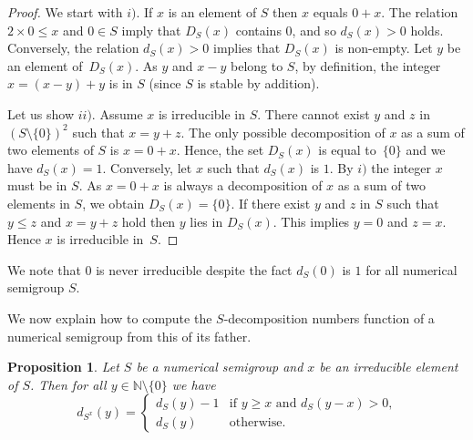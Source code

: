 \documentclass[reqno,11pt]{amsart}
\theoremstyle{plain}
\newtheorem{prop}{Proposition}[section]
\theoremstyle{definition}
\renewcommand{\leq}{\leqslant}
\renewcommand{\geq}{\geqslant}
\newcommand{\NN}{\mathbb{N}}
\begin{document}
\begin{proof}
We start with $i)$. If $x$ is an element of $S$ then $x$ equals $0+x$. 
The relation~$2\times 0\leq x$ and $0\in S$ imply that $D_S(x)$ contains $0$, and so $d_S(x)>0$ holds.
Conversely, the relation  $d_S(x)>0$  implies that $D_S(x)$ is non-empty. 
Let $y$ be an element of~$D_S(x)$. 
As $y$ and $x-y$ belong to  $S$, by definition, the integer $x=(x-y)+y$ is in $S$  (since $S$ is stable by addition).

Let us show $ii)$. 
Assume $x$ is irreducible in $S$.
There cannot exist $y$ and $z$ in~$(S\setminus\{0\})^2$ such that $x=y+z$. 
The only possible decomposition of $x$ as a sum of two elements of $S$ is $x=0+x$. 
Hence, the set $D_S(x)$ is equal to~$\{0\}$ and we have $d_S(x)=1$. 
Conversely, let $x$ such that $d_S(x)$ is $1$. 
By  $i)$ the  integer $x$ must be in $S$. 
As $x=0+x$ is always a decomposition of $x$ as a sum of two elements in $S$, we obtain $D_S(x)=\{0\}$.
If there exist $y$ and $z$ in $S$ such that $y\leq z$ and $x=y+z$ hold then $y$ lies in $D_S(x)$. 
This implies $y=0$ and $z=x$. 
Hence $x$ is irreducible in~$S$.
\end{proof}

We note  that $0$ is never irreducible despite the fact $d_S(0)$ is $1$ for all numerical semigroup $S$.

We now explain how to compute the $S$-decomposition numbers function of a numerical semigroup  from this of its father.

\begin{prop}
Let $S$ be a numerical semigroup and $x$ be an irreducible element of $S$. 
Then for all $y\in \NN\setminus\{0\}$ we have
\[
d_{S^x}(y)=\begin{cases}
d_S(y)-1&\text{if $y\geq x$ and $d_S(y-x)>0$,}\\
d_S(y) &\text{otherwise.}
\end{cases}
\] 
\end{prop}
\end{document}
